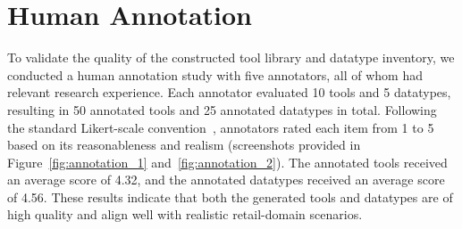 \section{Human Annotation}
\label{app:human-annotation}

To validate the quality of the constructed tool library and datatype inventory, we conducted a human annotation study with five annotators, all of whom had relevant research experience. 
Each annotator evaluated 10 tools and 5 datatypes, resulting in 50 annotated tools and 25 annotated datatypes in total. 
Following the standard Likert-scale convention~\citep{likert1932technique}, annotators rated each item from 1 to 5 based on its reasonableness and realism (screenshots provided in Figure~\ref{fig:annotation_1} and~\ref{fig:annotation_2}). The annotated tools received an average score of 4.32, and the annotated datatypes received an average score of 4.56. These results indicate that both the generated tools and datatypes are of high quality and align well with realistic retail-domain scenarios.







